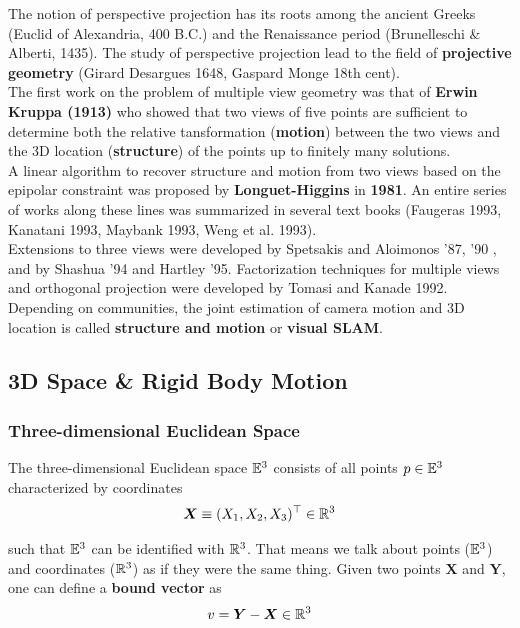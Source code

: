The notion of perspective projection has its roots among the ancient Greeks
(Euclid of Alexandria, \roughly{} 400 B.C.) and the Renaissance period
(Brunelleschi \& Alberti, 1435).
The study of perspective projection lead to the field of
\textbf{projective geometry} (Girard Desargues 1648, Gaspard Monge 18th cent).\\

The first work on the problem of multiple view geometry was that of
\textbf{Erwin Kruppa (1913)} who showed that two views of five points
are sufficient to determine both the relative tansformation
(\textbf{motion}) between the two views and the 3D location (\textbf{structure})
of the points up to finitely many solutions.\\

A linear algorithm to recover structure and motion from two views based
on the epipolar constraint was proposed by \textbf{Longuet-Higgins}
in \textbf{1981}. An entire series of works along these lines was summarized
in several text books (Faugeras 1993, Kanatani 1993,
Maybank 1993, Weng et al. 1993).\\

Extensions to three views were developed by Spetsakis and Aloimonos '87, '90
, and by Shashua '94 and Hartley '95.
Factorization techniques for multiple views and orthogonal projection were
developed by Tomasi and Kanade 1992.\\

Depending on communities, the joint estimation of camera motion and 3D location is called
\textbf{structure and motion} or \textbf{visual SLAM}.

\subsection{3D Space \& Rigid Body Motion}%
\label{sub:3d_space_rigid_body_motion}


\subsubsection{Three-dimensional Euclidean Space}%
\label{ssub:three_dimensional_euclidean_space}

The three-dimensional Euclidean space $\mathbb{E}^3$ consists of all points
$p \in \mathbb{E}^3$ characterized by coordinates
	\[\bm{X} \equiv (X_1, X_2, X_3)^{\top} \in \mathbb{R}^3\]

such that $\mathbb{E}^3$ can be identified with $\mathbb{R}^3$.
That means we talk about points ($\mathbb{E}^3$) and coordinates ($\mathbb{R}^3$)
as if they were the same thing. Given two points $\bm{X}$ and $\bm{Y}$,
one can define a \textbf{bound vector} as
	\[v = \bm{Y} - \bm{X} \in \mathbb{R}^3\]

